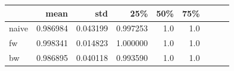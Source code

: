 \documentclass[10pt,conference,compsocconf,a4paper]{IEEEtran}
\newcommand{\nunit}[1]{\ \si{#1}}  %
\newcommand*{\shortautoref}[1]{%
	\begingroup
	\def\equationautorefname{\textsc{Eq.}}%
	\def\tableautorefname{\textsc{Tab.}}%
	\def\figureautorefname{\textsc{Fig.}}%
	\autoref{#1}%
	\endgroup
}
\begin{document}


		\begin{table}
			\centering
			\begin{tabular}{lrrrrrrrr}
			\toprule
			{} &             mean &       std &      25\% &  50\% &  75\% \\
			\midrule
			naive         &  0.986984 &  0.043199 &  0.997253 &  1.0 &  1.0 \\
			fw            &  0.998341 &  0.014823 &  1.000000 &  1.0 &  1.0 \\
			bw            &  0.986895 &  0.040118 &  0.993590 &  1.0 &  1.0 \\

\end{tabular}
\end{table}
\end{document}
